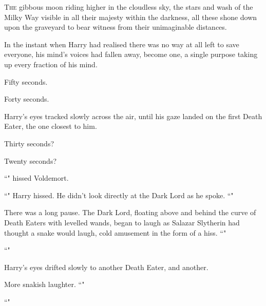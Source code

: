 
\lettrine{T}{he} gibbous moon riding higher in the cloudless sky, the stars and wash of the Milky Way visible in all their majesty within the darkness, all these shone down upon the graveyard to bear witness from their unimaginable distances.

In the instant when Harry had realised there was no way at all left to save everyone, his mind's voices had fallen away, become one, a single purpose taking up every fraction of his mind.

Fifty seconds.

Forty seconds.

Harry's eyes tracked slowly across the air, until his gaze landed on the first Death Eater, the one closest to him.

Thirty seconds?

Twenty seconds?

``" hissed Voldemort.

``" Harry hissed. He didn't look directly at the Dark Lord as he spoke. ``"

There was a long pause. The Dark Lord, floating above and behind the curve of Death Eaters with levelled wands, began to laugh as Salazar Slytherin had thought a snake would laugh, cold amusement in the form of a hiss. ``"

``"

Harry's eyes drifted slowly to another Death Eater, and another.

More snakish laughter. ``"

``"

